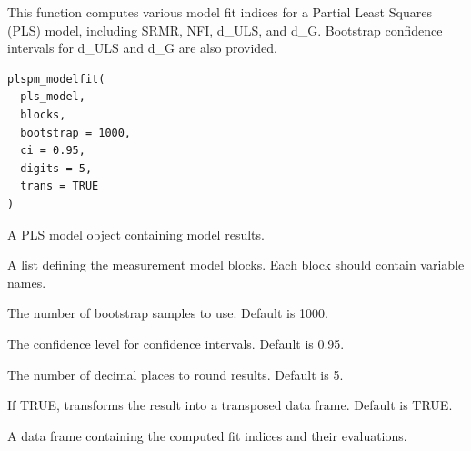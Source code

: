 \documentclass[a4paper]{book}
\begin{document}
%
\begin{Description}
This function computes various model fit indices for a Partial Least Squares (PLS) model, including SRMR, NFI, d\_ULS, and d\_G.
Bootstrap confidence intervals for d\_ULS and d\_G are also provided.
\end{Description}
%
\begin{Usage}
\begin{verbatim}
plspm_modelfit(
  pls_model,
  blocks,
  bootstrap = 1000,
  ci = 0.95,
  digits = 5,
  trans = TRUE
)
\end{verbatim}
\end{Usage}
%
\begin{Arguments}
\begin{ldescription}
\item[\code{pls\_model}] A PLS model object containing model results.

\item[\code{blocks}] A list defining the measurement model blocks. Each block should contain variable names.

\item[\code{bootstrap}] The number of bootstrap samples to use. Default is 1000.

\item[\code{ci}] The confidence level for confidence intervals. Default is 0.95.

\item[\code{digits}] The number of decimal places to round results. Default is 5.

\item[\code{trans}] If TRUE, transforms the result into a transposed data frame. Default is TRUE.
\end{ldescription}
\end{Arguments}
%
\begin{Value}
A data frame containing the computed fit indices and their evaluations.
\end{Value}
\end{document}
